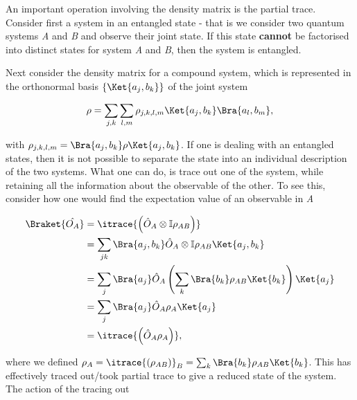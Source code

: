 An  important operation  involving  the density  matrix  is the  partial
trace.   Consider first  a system  in an  entangled state  - that  is we
consider two quantum systems \textit{A} and \textit{B} and observe their
joint state. If  this state \textbf{cannot} be  factorised into distinct
states  for  system  \textit{A}  and  \textit{B},  then  the  system  is
entangled.

Next  consider  the density  matrix  for  a  compound system,  which  is
represented          in          the          orthonormal          basis
$\left\lbrace \Ket{a_j,b_k}\right\rbrace $ of the joint system

\begin{equation}
  \rho = \sum_{j,k}\sum_{l,m} \rho_{j,k,l,m}\Ket{a_j,b_k}\Bra{a_l,b_m},
\end{equation}

with  $\rho_{j,k,l,m}  =  \Bra{a_j,b_k}\rho\Ket{a_j,b_k}$.   If  one  is
dealing with  an entangled states, then  it is not possible  to separate
the state into  an individual description of the two  systems.  What one
can  do,  is trace  out  one  of the  system,  while  retaining all  the
information about the observable of the other. To see this, consider how
one would find the expectation value of an observable in \textit{A}

\begin{equation}
  \begin{aligned}
    \Braket{\hat{O_A}} & = \itrace{\left( \hat{O}_A\otimes \mathbb{I} \rho_{AB}\right)} \\
    & = \sum_{jk} \Bra{a_j,b_k} \hat{O}_A\otimes \mathbb{I} \rho_{AB} \Ket{a_j,b_k}\\
    & = \sum_j\Bra{a_j}\hat{O}_A\left( \sum_k\Bra{b_k}\rho_{AB}\Ket{b_k}\right) \Ket{a_j} \\
    & = \sum_j\Bra{a_j}\hat{O}_A\rho_A \Ket{a_j}\\
    & = \itrace{\left( \hat{O}_A\rho_A \right)},
  \end{aligned}
\end{equation}

\noindent                where                 we                defined
$\rho_A        =         \itrace{(\rho_{AB})}_B        =        \sum_{k}
\Bra{b_{k}}\rho_{AB}\Ket{b_{k}}$. This  has effectively  traced out/took
partial trace to give a reduced state  of the system.  The action of the
tracing out


